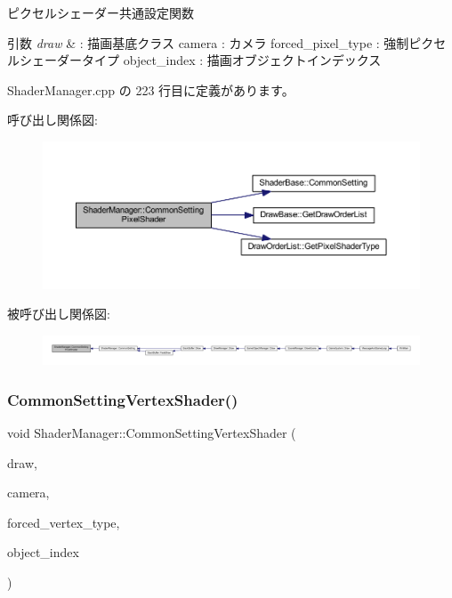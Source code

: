ピクセルシェーダー共通設定関数 


\begin{DoxyParams}{引数}
{\em draw} & \+: 描画基底クラス camera \+: カメラ forced\+\_\+pixel\+\_\+type \+: 強制ピクセルシェーダータイプ object\+\_\+index \+: 描画オブジェクトインデックス \\
\hline
\end{DoxyParams}


 Shader\+Manager.\+cpp の 223 行目に定義があります。

呼び出し関係図\+:\nopagebreak
\begin{figure}[H]
\begin{center}
\leavevmode
\includegraphics[width=350pt]{class_shader_manager_ad2b591958e1d22d746e5ed3d7941e4c1_cgraph}
\end{center}
\end{figure}
被呼び出し関係図\+:
\nopagebreak
\begin{figure}[H]
\begin{center}
\leavevmode
\includegraphics[width=350pt]{class_shader_manager_ad2b591958e1d22d746e5ed3d7941e4c1_icgraph}
\end{center}
\end{figure}
\mbox{\label{class_shader_manager_a836c92ee48dfbf8b8c8085f9413027bd}} 
\subsubsection{\texorpdfstring{Common\+Setting\+Vertex\+Shader()}{CommonSettingVertexShader()}}
{\footnotesize\ttfamily void Shader\+Manager\+::\+Common\+Setting\+Vertex\+Shader (\begin{DoxyParamCaption}\item[{\mbox{\hyperlink{class_draw_base}{Draw\+Base}} $\ast$}]{draw,  }\item[{\mbox{\hyperlink{class_camera}{Camera}} $\ast$}]{camera,  }\item[{\mbox{\hyperlink{class_shader_manager_a9b51e49d70eb3cc58f6d1f3994e8cfbd}{Vertex\+Shader\+Type}}}]{forced\+\_\+vertex\+\_\+type,  }\item[{unsigned}]{object\+\_\+index }\end{DoxyParamCaption})\hspace{0.3cm}{\ttfamily [private]}}



